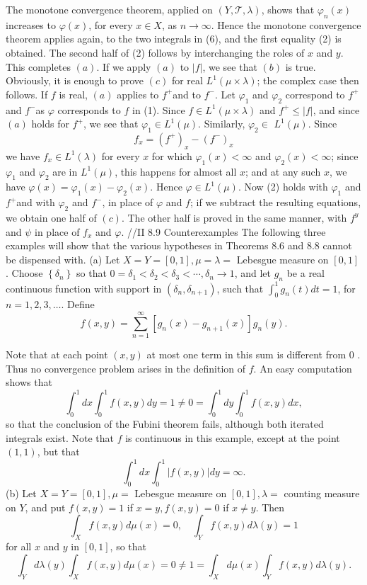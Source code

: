 The monotone convergence theorem, applied on $(Y, \mathscr{T}, \lambda)$, shows that $\varphi_n(x)$ increases to $\varphi(x)$, for every $x \in X$, as $n \rightarrow \infty$. Hence the monotone convergence theorem applies again, to the two integrals in (6), and the first equality (2) is obtained. The second half of (2) follows by interchanging the roles of $x$ and $y$. This completes $(a)$.
If we apply $(a)$ to $|f|$, we see that $(b)$ is true.
Obviously, it is enough to prove $(c)$ for real $L^1(\mu \times \lambda)$; the complex case then follows. If $f$ is real, $(a)$ applies to $f^{+}$and to $f^{-}$. Let $\varphi_1$ and $\varphi_2$ correspond to $f^{+}$and $f^{-}$as $\varphi$ corresponds to $f$ in (1). Since $f \in L^1(\mu \times \lambda)$ and
$f^{+} \leq|f|$, and since $(a)$ holds for $f^{+}$, we see that $\varphi_1 \in L^1(\mu)$. Similarly, $\varphi_2 \in$ $L^1(\mu)$. Since
$$
f_x=\left(f^{+}\right)_x-\left(f^{-}\right)_x
$$
we have $f_x \in L^1(\lambda)$ for every $x$ for which $\varphi_1(x)<\infty$ and $\varphi_2(x)<\infty$; since $\varphi_1$ and $\varphi_2$ are in $L^1(\mu)$, this happens for almost all $x$; and at any such $x$, we have $\varphi(x)=\varphi_1(x)-\varphi_2(x)$. Hence $\varphi \in L^1(\mu)$. Now (2) holds with $\varphi_1$ and $f^{+}$and with $\varphi_2$ and $f^{-}$, in place of $\varphi$ and $f$; if we subtract the resulting equations, we obtain one half of $(c)$. The other half is proved in the same manner, with $f^y$ and $\psi$ in place of $f_x$ and $\varphi$.
//II
8.9 Counterexamples The following three examples will show that the various hypotheses in Theorems 8.6 and 8.8 cannot be dispensed with.
(a) Let $X=Y=[0,1], \mu=\lambda=$ Lebesgue measure on $[0,1]$. Choose $\left\{\delta_n\right\}$ so that $0=\delta_1<\delta_2<\delta_3<\cdots, \delta_n \rightarrow 1$, and let $g_n$ be a real continuous function with support in $\left(\delta_n, \delta_{n+1}\right)$, such that $\int_0^1 g_n(t) d t=1$, for $n=1,2,3, \ldots$. Define
$$
f(x, y)=\sum_{n=1}^{\infty}\left[g_n(x)-g_{n+1}(x)\right] g_n(y) .
$$

Note that at each point $(x, y)$ at most one term in this sum is different from 0 . Thus no convergence problem arises in the definition of $f$. An easy computation shows that
$$
\int_0^1 d x \int_0^1 f(x, y) d y=1 \neq 0=\int_0^1 d y \int_0^1 f(x, y) d x,
$$
so that the conclusion of the Fubini theorem fails, although both iterated integrals exist. Note that $f$ is continuous in this example, except at the point $(1,1)$, but that
$$
\int_0^1 d x \int_0^1|f(x, y)| d y=\infty .
$$
(b) Let $X=Y=[0,1], \mu=$ Lebesgue measure on $[0,1], \lambda=$ counting measure on $Y$, and put $f(x, y)=1$ if $x=y, f(x, y)=0$ if $x \neq y$. Then
$$
\int_X f(x, y) d \mu(x)=0, \quad \int_Y f(x, y) d \lambda(y)=1
$$
for all $x$ and $y$ in $[0,1]$, so that
$$
\int_Y d \lambda(y) \int_X f(x, y) d \mu(x)=0 \neq 1=\int_X d \mu(x) \int_Y f(x, y) d \lambda(y) .
$$

